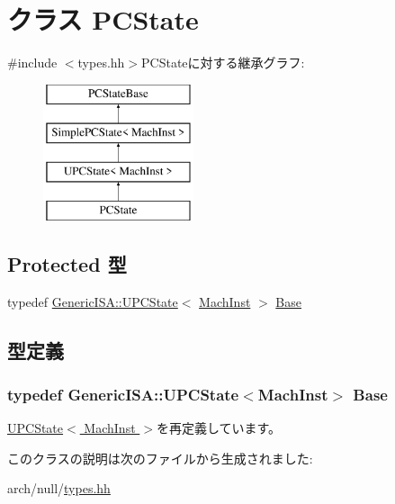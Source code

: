\hypertarget{classNullISA_1_1PCState}{
\section{クラス PCState}
\label{classNullISA_1_1PCState}
}


{\ttfamily \#include $<$types.hh$>$}PCStateに対する継承グラフ:\begin{figure}[H]
\begin{center}
\leavevmode
\includegraphics[height=4cm]{classNullISA_1_1PCState}
\end{center}
\end{figure}
\subsection*{Protected 型}
\begin{DoxyCompactItemize}
\item 
typedef \hyperlink{classGenericISA_1_1UPCState}{GenericISA::UPCState}$<$ \hyperlink{namespaceNullISA_a301c22ea09fa33dcfe6ddf22f203699c}{MachInst} $>$ \hyperlink{classNullISA_1_1PCState_aa6c21965de6773cbfc732c23d7263a9f}{Base}
\end{DoxyCompactItemize}


\subsection{型定義}
\hypertarget{classNullISA_1_1PCState_aa6c21965de6773cbfc732c23d7263a9f}{
\subsubsection[{Base}]{\setlength{\rightskip}{0pt plus 5cm}typedef {\bf GenericISA::UPCState}$<${\bf MachInst}$>$ {\bf Base}}}
\label{classNullISA_1_1PCState_aa6c21965de6773cbfc732c23d7263a9f}


\hyperlink{classGenericISA_1_1UPCState_a6d61e15302422cb743d88ee2ca4fd482}{UPCState$<$ MachInst $>$}を再定義しています。

このクラスの説明は次のファイルから生成されました:\begin{DoxyCompactItemize}
\item 
arch/null/\hyperlink{arch_2null_2types_8hh}{types.hh}\end{DoxyCompactItemize}
